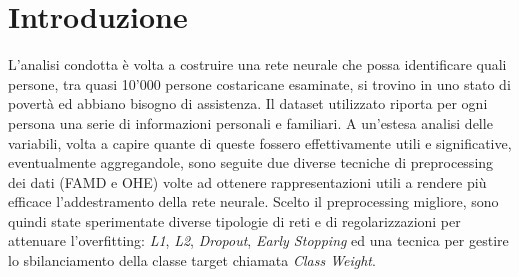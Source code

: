 \section{Introduzione}


L'analisi condotta è volta a costruire una rete neurale che possa identificare quali persone, tra quasi 10'000 persone costaricane esaminate, si trovino in uno stato di povertà ed abbiano bisogno di assistenza. Il dataset utilizzato riporta per ogni persona una serie di informazioni personali e familiari.
A un'estesa analisi delle variabili, volta a capire quante di queste fossero effettivamente utili e significative, eventualmente aggregandole, sono seguite due diverse tecniche di preprocessing dei dati (FAMD e OHE) volte ad ottenere rappresentazioni utili a rendere più efficace l'addestramento della rete neurale. 
Scelto il preprocessing migliore, sono quindi state sperimentate diverse tipologie di reti e di regolarizzazioni per attenuare l'overfitting: \textit{L1}, \textit{L2}, \textit{Dropout}, \textit{Early Stopping} ed una tecnica per gestire lo sbilanciamento della classe target chiamata \textit{Class Weight}.